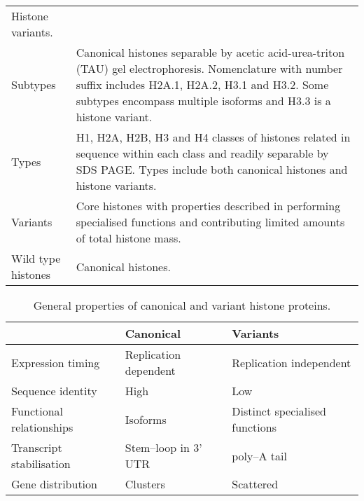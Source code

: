 \begin{table*}
\begin{tabular}{F p{\dimexpr(\textwidth--4\tabcolsep)}}
	  Histone variants. \\
      \addlinespace
	  Subtypes &
	  Canonical histones separable by acetic acid-urea-triton (TAU) gel electrophoresis. 
	  Nomenclature with number suffix includes H2A.1, H2A.2, H3.1 and H3.2. 
	  Some subtypes encompass multiple isoforms and H3.3 is a histone variant. \\
      \addlinespace
	  Types &
	  H1, H2A, H2B, H3 and H4 classes of histones
	  related in sequence within each class and readily separable by SDS PAGE. 
	  Types include both canonical histones and histone variants. \\
      \addlinespace
	  Variants &
	  Core histones with properties described in  
	  performing specialised functions and contributing limited amounts of total histone mass. \\
      \addlinespace
	  Wild type histones &
	  Canonical histones. \\
      \bottomrule
    \end{tabular}
  \end{table*}

  \begin{table*}
    \caption{General properties of canonical and variant histone proteins.}
    \label{tab:typical-histone-differences}
    \centering
    \begin{tabular}{l l l}
      \toprule
      \null                     & Canonical             & Variants \\
      \midrule
      Expression timing         & Replication dependent & Replication independent \\
      Sequence identity         & High                  & Low \\
      Functional relationships  & Isoforms              & Distinct specialised functions \\
      Transcript stabilisation  & Stem--loop in 3' UTR  & poly--A tail \\
      Gene distribution         & Clusters              & Scattered \\
      \bottomrule
    \end{tabular}
  \end{table*}

